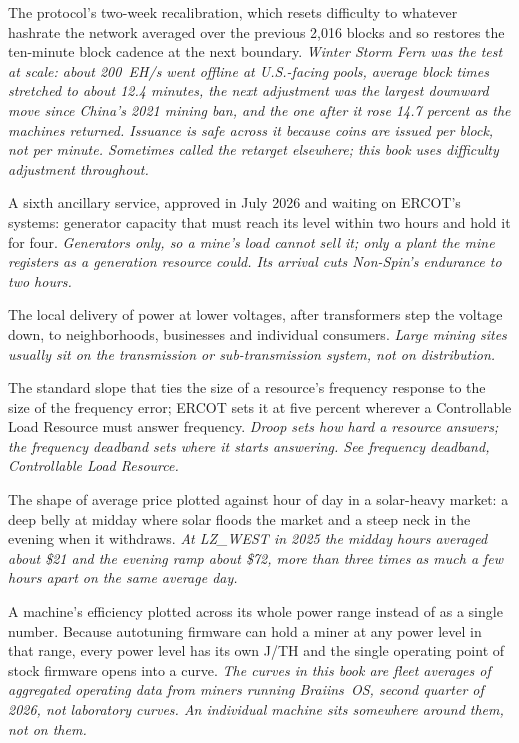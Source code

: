 \begin{description}[leftmargin=0pt,style=unboxed,itemsep=0.35em,parsep=0.15em]
\item[difficulty adjustment] \hypertarget{glossary:difficulty-adjustment}{}The protocol's two-week recalibration, which resets difficulty to whatever hashrate the network averaged over the previous 2,016 blocks and so restores the ten-minute block cadence at the next boundary. \emph{Winter Storm Fern was the test at scale: about 200~EH/s went offline at U.S.-facing pools, average block times stretched to about 12.4 minutes, the next adjustment was the largest downward move since China's 2021 mining ban, and the one after it rose 14.7 percent as the machines returned. Issuance is safe across it because coins are issued per block, not per minute. Sometimes called the retarget elsewhere; this book uses difficulty adjustment throughout.}
\item[Dispatchable Reliability Reserve Service] \hypertarget{glossary:dispatchable-reliability-reserve-service}{}A sixth ancillary service, approved in July 2026 and waiting on ERCOT's systems: generator capacity that must reach its level within two hours and hold it for four. \emph{Generators only, so a mine's load cannot sell it; only a plant the mine registers as a generation resource could. Its arrival cuts Non-Spin's endurance to two hours.}
\item[distribution] \hypertarget{glossary:distribution}{}The local delivery of power at lower voltages, after transformers step the voltage down, to neighborhoods, businesses and individual consumers. \emph{Large mining sites usually sit on the transmission or sub-transmission system, not on distribution.}
\item[droop] \hypertarget{glossary:droop}{}The standard slope that ties the size of a resource's frequency response to the size of the frequency error; ERCOT sets it at five percent wherever a Controllable Load Resource must answer frequency. \emph{Droop sets how hard a resource answers; the frequency deadband sets where it starts answering. See frequency deadband, Controllable Load Resource.}
\item[duck curve] \hypertarget{glossary:duck-curve}{}The shape of average price plotted against hour of day in a solar-heavy market: a deep belly at midday where solar floods the market and a steep neck in the evening when it withdraws. \emph{At LZ\_WEST in 2025 the midday hours averaged about \$21 and the evening ramp about \$72, more than three times as much a few hours apart on the same average day.}
\item[efficiency curve] \hypertarget{glossary:efficiency-curve}{}A machine's efficiency plotted across its whole power range instead of as a single number. Because autotuning firmware can hold a miner at any power level in that range, every power level has its own J/TH and the single operating point of stock firmware opens into a curve. \emph{The curves in this book are fleet averages of aggregated operating data from miners running Braiins~OS, second quarter of 2026, not laboratory curves. An individual machine sits somewhere around them, not on them.}

\end{description}
